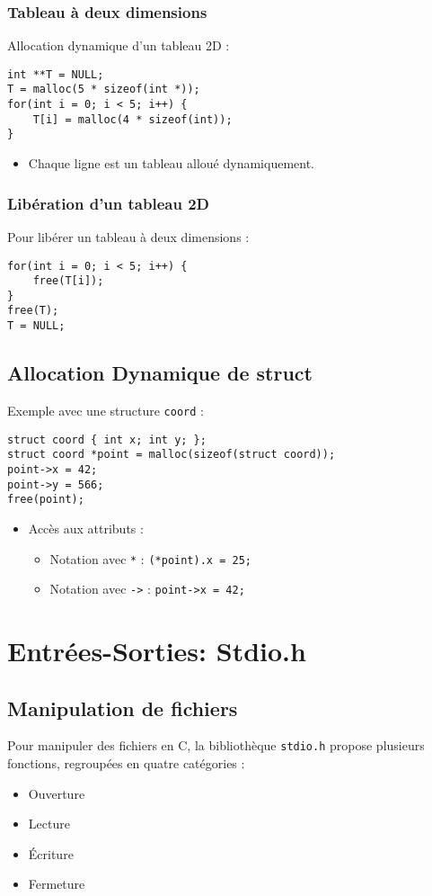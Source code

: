\documentclass[french,11pt]{article}
\begin{document}
\subsubsection{Tableau à deux dimensions}
Allocation dynamique d’un tableau 2D :
\begin{verbatim}
int **T = NULL;
T = malloc(5 * sizeof(int *));
for(int i = 0; i < 5; i++) {
    T[i] = malloc(4 * sizeof(int));
}
\end{verbatim}
\begin{itemize}
    \item Chaque ligne est un tableau alloué dynamiquement.
\end{itemize}

\subsubsection{Libération d’un tableau 2D}
Pour libérer un tableau à deux dimensions :
\begin{verbatim}
for(int i = 0; i < 5; i++) {
    free(T[i]);
}
free(T);
T = NULL;
\end{verbatim}

\subsection{Allocation Dynamique de struct}
Exemple avec une structure \texttt{coord} :
\begin{verbatim}
struct coord { int x; int y; };
struct coord *point = malloc(sizeof(struct coord));
point->x = 42;
point->y = 566;
free(point);
\end{verbatim}
\begin{itemize}
    \item Accès aux attributs :
    \begin{itemize}
        \item Notation avec \texttt{*} : \texttt{(*point).x = 25;}
        \item Notation avec \texttt{->} : \texttt{point->x = 42;}
    \end{itemize}
\end{itemize}
\section{Entrées-Sorties: Stdio.h}

\subsection{Manipulation de fichiers}
Pour manipuler des fichiers en C, la bibliothèque \texttt{stdio.h} propose plusieurs fonctions, regroupées en quatre catégories :
\begin{itemize}
    \item Ouverture
    \item Lecture
    \item Écriture
    \item Fermeture
\end{itemize}
\end{document}
